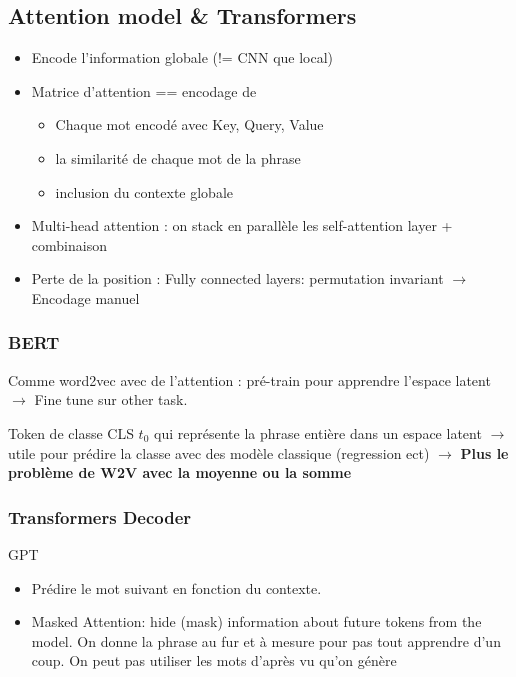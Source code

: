 \documentclass{article}
\theoremstyle{plain}%
\theoremstyle{definition}
\theoremstyle{remark}
\begin{document}
\subsection{Attention model \& Transformers }
\begin{itemize}
    \item Encode l'information globale (!= CNN que local)
    \item Matrice d'attention == encodage de \begin{itemize}
        \item Chaque mot encodé avec Key, Query, Value
        \item la similarité de chaque mot de la phrase
        \item inclusion du contexte globale
    \end{itemize} 
    \item Multi-head attention : on stack en parallèle les self-attention layer + combinaison
    \item Perte de la position : Fully connected layers: permutation invariant $\rightarrow$ Encodage manuel 
\end{itemize}

\subsubsection{BERT}
Comme word2vec avec de l'attention : pré-train pour apprendre l'espace latent $\rightarrow$ Fine tune sur other task. 

Token de classe CLS $t_0$ qui représente la phrase entière dans un espace latent $\rightarrow$ utile pour prédire la classe avec des modèle classique (regression ect) $\rightarrow$ \textbf{Plus le problème de W2V avec la moyenne ou la somme}

\subsubsection{Transformers Decoder}
GPT
\begin{itemize}
    \item Prédire le mot suivant en fonction du contexte.
    \item Masked Attention: hide (mask) information about future tokens from the model. On donne la phrase au fur et à mesure pour pas tout apprendre d'un coup. On peut pas utiliser les mots d'après vu qu'on génère
\end{itemize}
\end{document}
